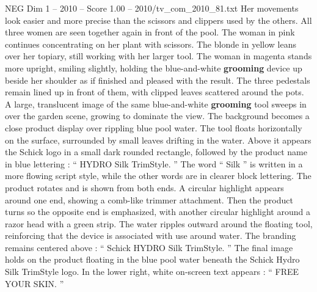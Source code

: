 \begin{textsample}{NEG Dim 1 – 2010 – Score 1.00 – 2010/tv\_com\_2010\_81.txt}
Her movements look easier and more precise than the scissors and clippers used by the others.
All three women are seen together again in front of the pool.
The woman in pink continues concentrating on her plant with scissors.
The blonde in yellow leans over her topiary, still working with her larger tool.
The woman in magenta stands more upright, smiling slightly, holding the blue-and-white \textbf{grooming} device up beside her shoulder as if finished and pleased with the result.
The three pedestals remain lined up in front of them, with clipped leaves scattered around the pots.
A large, translucent image of the same blue-and-white \textbf{grooming} tool sweeps in over the garden scene, growing to dominate the view.
The background becomes a close product display over rippling blue pool water.
The tool floats horizontally on the surface, surrounded by small leaves drifting in the water.
Above it appears the Schick logo in a small dark rounded rectangle, followed by the product name in blue lettering : “ HYDRO Silk TrimStyle. ” The word “ Silk ” is written in a more flowing script style, while the other words are in clearer block lettering.
The product rotates and is shown from both ends.
A circular highlight appears around one end, showing a comb-like trimmer attachment.
Then the product turns so the opposite end is emphasized, with another circular highlight around a razor head with a green strip.
The water ripples outward around the floating tool, reinforcing that the device is associated with use around water.
The branding remains centered above : “ Schick HYDRO Silk TrimStyle. ” The final image holds on the product floating in the blue pool water beneath the Schick Hydro Silk TrimStyle logo.
In the lower right, white on-screen text appears : “ FREE YOUR SKIN. ”

\end{textsample}
